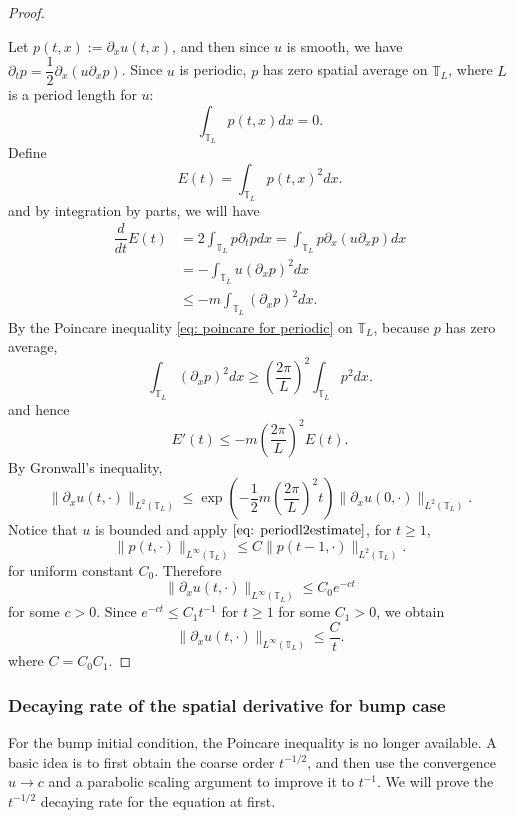 \begin{proof}\ \par
    Let $p(t,x) := \partial_x u(t,x)$, and then since $u$ is smooth, we have 
    \(
        \partial_tp=\dfrac12 \partial_x (u \partial_x p)
    \). Since $u$ is periodic, $p$ has zero spatial average on $\mathbb T_L$, where $L$ is a period length for $u$:
    \[
        \int_{\mathbb T_L}p(t,x)dx=0.
    \]
    Define
    \[
        E(t)=\int_{\mathbb T_L}p(t,x)^2dx.
    \]
    and by integration by parts, we will have
    \[
    \begin{aligned}
        \dfrac{d}{dt}E(t) &=2\int_{\mathbb T_L}p \partial_tp dx =\int_{\mathbb T_L}p \partial_x(u\partial_xp) dx \\
        &=-\int_{\mathbb T_L}u (\partial_xp)^2 dx \\
        &\leq -m\int_{\mathbb T_L}(\partial_xp)^2dx .
    \end{aligned}
    \]
    By the Poincare inequality \eqref{eq: poincare for periodic} on $\mathbb T_L$, because $p$ has zero average,
    \[
        \int_{\mathbb T_L}(\partial_xp)^2dx
        \geq \left(\dfrac{2\pi}{L}\right)^2
        \int_{\mathbb T_L}p^2dx .
    \]
    and hence
    \[
        E'(t)\leq -m\left(\dfrac{2\pi}{L}\right)^2E(t).
    \]
    By Gronwall's inequality,
    \[
        \lVert \partial_x u(t,\cdot)\rVert_{L^2(\mathbb T_L)}
        \leq
        \exp\left(-\dfrac12m\left(\dfrac{2\pi}{L}\right)^2t\right)
        \lVert \partial_x u(0,\cdot)\rVert_{L^2(\mathbb T_L)}.
    \]
    Notice that $u$ is bounded and apply $\eqref{eq: periodl2estimate}$, for $t\geq1$,
    \[
        \lVert p(t,\cdot)\rVert_{L^{\infty}(\mathbb T_L)}
        \leq C\lVert p(t-1,\cdot)\rVert_{L^2(\mathbb T_L)} .
    \]
    for uniform constant $C_0$. Therefore
    \[
        \lVert \partial_xu(t,\cdot)\rVert_{L^{\infty}(\mathbb T_L)}
        \leq C_0 e^{-ct}
    \]
    for some $c>0$. Since $e^{-ct}\leq C_1t^{-1}$ for $t\geq 1$ for some $C_1 > 0$, we obtain
    \[
        \lVert \partial_x u(t,\cdot)\rVert_{L^{\infty}(\mathbb T_L)}\leq \dfrac{C}{t}.
    \]
    where $C=C_0C_1$.
\end{proof}

\subsubsection{Decaying rate of the spatial derivative for bump case}

For the bump initial condition, the Poincare inequality is no longer available. A basic idea is to first obtain the coarse order $t^{-1/2}$, and then use the convergence $u\to c$ and a parabolic scaling argument to improve it to $t^{-1}$. We will prove the $t^{-1/2}$ decaying rate for the equation at first.

